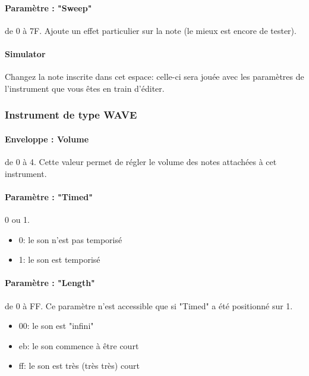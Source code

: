 \documentclass[12pt,a4paper]{article}
\begin{document}
            \paragraph{Paramètre : "Sweep"} de 0 à 7F. Ajoute un effet particulier sur la note (le mieux est encore de tester).

            \paragraph{Simulator} Changez la note inscrite dans cet espace: celle-ci sera jouée avec les paramètres de l'instrument que vous êtes en train d'éditer.
        
        \subsubsection{Instrument de type WAVE}
        
        
        \paragraph{Enveloppe : Volume} de 0 à 4. Cette valeur permet de régler le volume des notes attachées à cet instrument. 
        
        \paragraph{Paramètre : "Timed"} 0 ou 1.
        \begin{itemize}
                \item{0: le son n'est pas temporisé}
                \item{1: le son est temporisé}
            \end{itemize} 
        
        \paragraph{Paramètre : "Length"} de 0 à FF. Ce paramètre n'est accessible que si "Timed" a été positionné sur 1.
        \begin{itemize}
                \item{00: le son est "infini"}
                \item{eb: le son commence à être court}
                \item{ff: le son est très (très très) court}
            \end{itemize}
        
\end{document}
